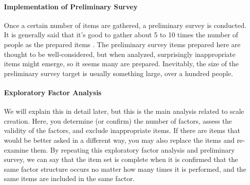 \documentclass{ltjsbook}
\begin{document}
\paragraph{Implementation of Preliminary Survey} Once a certain number of items are gathered, a preliminary survey is conducted. It is generally said that it's good to gather about 5 to 10 times the number of people as the prepared items \parencite{kosugi2016a}. The preliminary survey items prepared here are thought to be well-considered, but when analyzed, surprisingly inappropriate items might emerge, so it seems many are prepared. Inevitably, the size of the preliminary survey target is usually something large, over a hundred people.

\paragraph{Exploratory Factor Analysis} We will explain this in detail later, but this is the main analysis related to scale creation. Here, you determine (or confirm) the number of factors, assess the validity of the factors, and exclude inappropriate items. If there are items that would be better asked in a different way, you may also replace the items and re-examine them. By repeating this exploratory factor analysis and preliminary survey, we can say that the item set is complete when it is confirmed that the same factor structure occurs no matter how many times it is performed, and the same items are included in the same factor.

\end{document}
